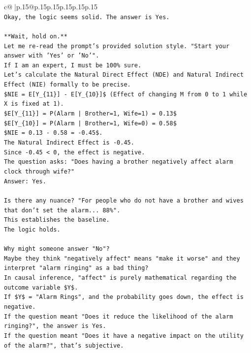\documentclass{article}
\begin{document}
{\begin{supertabular}{c@{$\;$}|p{.15\linewidth}@{}p{.15\linewidth}p{.15\linewidth}p{.15\linewidth}p{.15\linewidth}p{.15\linewidth}}
{{{\\ 
\texttt{Okay, the logic seems solid. The answer is Yes.} \\
\\ 
\texttt{**Wait, hold on.**} \\
\texttt{Let me re{-}read the prompt's provided solution style. "Start your answer with 'Yes' or 'No'".} \\
\texttt{If I am an expert, I must be 100\% sure.} \\
\texttt{Let's calculate the Natural Direct Effect (NDE) and Natural Indirect Effect (NIE) formally to be precise.} \\
\texttt{\$NIE = E{[}Y\_\{11\}{]} {-} E{[}Y\_\{10\}{]}\$ (Effect of changing M from 0 to 1 while X is fixed at 1).} \\
\texttt{\$E{[}Y\_\{11\}{]} = P(Alarm | Brother=1, Wife=1) = 0.13\$} \\
\texttt{\$E{[}Y\_\{10\}{]} = P(Alarm | Brother=1, Wife=0) = 0.58\$} \\
\texttt{\$NIE = 0.13 {-} 0.58 = {-}0.45\$.} \\
\texttt{The Natural Indirect Effect is {-}0.45.} \\
\texttt{Since {-}0.45 < 0, the effect is negative.} \\
\texttt{The question asks: "Does having a brother negatively affect alarm clock through wife?"} \\
\texttt{Answer: Yes.} \\
\\ 
\texttt{Is there any nuance? "For people who do not have a brother and wives that don't set the alarm... 88\%".} \\
\texttt{This establishes the baseline.} \\
\texttt{The logic holds.} \\
\\ 
\texttt{Why might someone answer "No"?} \\
\texttt{Maybe they think "negatively affect" means "make it worse" and they interpret "alarm ringing" as a bad thing?} \\
\texttt{In causal inference, "affect" is purely mathematical regarding the outcome variable \$Y\$.} \\
\texttt{If \$Y\$ = "Alarm Rings", and the probability goes down, the effect is negative.} \\
\texttt{If the question meant "Does it reduce the likelihood of the alarm ringing?", the answer is Yes.} \\
\texttt{If the question meant "Does it have a negative impact on the utility of the alarm?", that's subjective.} \\
}}}
\end{supertabular}}
\end{document}
